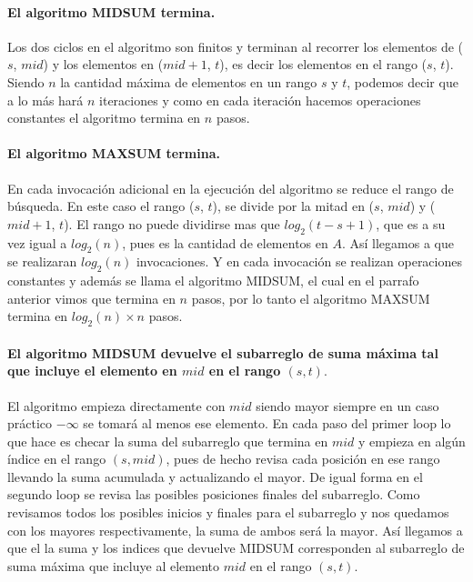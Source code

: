 \documentclass[12pt]{article}
\begin{document}
\paragraph{El algoritmo MIDSUM termina.} Los dos ciclos en el algoritmo son finitos y terminan al recorrer los elementos de ($s$, $mid$) y los elementos en ($mid + 1$, $t$), es decir los elementos en el rango ($s$, $t$). Siendo $n$ la cantidad máxima de elementos en un rango $s$ y $t$, podemos decir que a lo más hará $n$ iteraciones y como en cada iteración hacemos operaciones constantes el algoritmo termina en $n$ pasos.
\paragraph{El algoritmo MAXSUM termina.} En cada invocación adicional en la ejecución del algoritmo se reduce el rango de búsqueda. En este caso el rango ($s$, $t$), se divide por la mitad en ($s$, $mid$) y ($mid + 1$, $t$). El rango no puede dividirse mas que $log_2(t-s + 1)$, que es a su vez igual a $log_2(n)$, pues es la cantidad de elementos en $A$. Así llegamos a que se realizaran $log_2(n)$ invocaciones. Y en cada invocación se realizan operaciones constantes y además se llama el algoritmo MIDSUM, el cual en el parrafo anterior vimos que termina en $n$ pasos, por lo tanto el algoritmo MAXSUM termina en $log_2(n)\times n$ pasos. 
\paragraph{El algoritmo MIDSUM devuelve el subarreglo de suma máxima tal que incluye el elemento en $mid$ en el rango $(s, t).$} El algoritmo empieza directamente con $mid$ siendo mayor siempre en un caso práctico $-\infty$ se tomará al menos ese elemento. En cada paso del primer loop lo que hace es checar la suma del subarreglo que termina en $mid$ y empieza en algún índice en el rango $(s, mid)$, pues de hecho revisa cada posición en ese rango llevando la suma acumulada y actualizando el mayor. De igual forma en el segundo loop se revisa las posibles posiciones finales del subarreglo. Como revisamos todos los posibles inicios y finales para el subarreglo y nos quedamos con los mayores respectivamente, la suma de ambos será la mayor. Así llegamos a que el la suma y los indices que devuelve MIDSUM corresponden al subarreglo de suma máxima que incluye al elemento $mid$ en el rango $(s, t)$.
\end{document}
